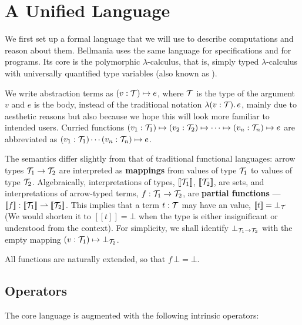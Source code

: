 \vspace{-3mm}
\section{A Unified Language}
\label{lang}

\newcommand\semp[1]{[\![{#1}]\!]}
\newcommand\fix{\operatorname{fix}}

We first set up a formal language that we will use to describe computations and reason about them.
Bellmania uses the same language for specifications and for programs.  Its core is the polymorphic
$\lambda$-calculus, that is, simply typed $\lambda$-calculus with universally quantified type variables 
(also known as ).

We write abstraction terms as $(v:\mathcal{T})\mapsto e$, where $\mathcal{T}$ is the type of the argument $v$ and $e$ is
the body, instead of the traditional notation $\lambda(v:\mathcal{T}).\,e$, mainly due to aesthetic reasons
but also because we hope this will look more familiar to intended users.
Curried functions $(v_1:\mathcal{T}_1)\mapsto (v_2:\mathcal{T}_2) \mapsto \cdots \mapsto (v_n:\mathcal{T}_n) \mapsto e$ are abbreviated 
as $(v_1:\mathcal{T}_1)\cdots(v_n:\mathcal{T}_n)\mapsto e$.

The semantics differ slightly from that of traditional functional languages: arrow types $\mathcal{T}_1\to\mathcal{T}_2$
are interpreted as {\bf mappings} from values of type $\mathcal{T}_1$ to values of type $\mathcal{T}_2$. Algebraically,
interpretations of types, $\semp{\T_1}$, $\semp{\T_2}$, are sets, and interpretations of arrow-typed terms,
$f : \mathcal{T}_1\to\mathcal{T}_2$, are {\bf partial functions} --- $\semp{f} : \semp{\T_1}\rightharpoonup\semp{\T_2}$.
This implies that a term $t : \mathcal{T}$ may have an  value, $\semp{t}=\bot_\T$
(We would shorten it to $\semp{t}=\bot$ when the type is either insignificant or understood from the context).
For simplicity, we shall identify $\bot_{\mathcal{T}_1\to\mathcal{T}_2}$ with the empty mapping $(v:\mathcal{T}_1)\mapsto\bot_{\mathcal{T}_2}$.

All functions are naturally extended, so that $f\,\bot=\bot$.

\subsection{Operators}
\label{lang:operators}

The core language is augmented with the following intrinsic operators:

